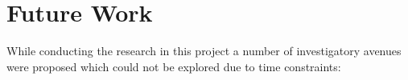 \documentclass[../dissertation.tex]{subfiles}
\begin{document}



\section{Future Work} %

While conducting the research in this project a number of investigatory avenues were proposed which could not be explored due to time constraints:
\end{document}
